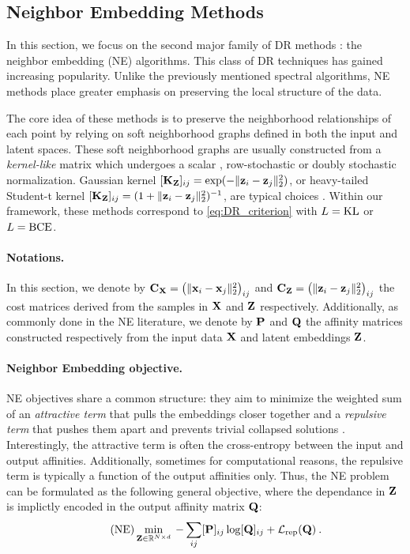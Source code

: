 \subsection{Neighbor Embedding Methods}

In this section, we focus on the second major family of DR methods : the neighbor embedding (NE) algorithms. This class of DR techniques has gained increasing popularity. Unlike the previously mentioned spectral algorithms, NE methods place greater emphasis on preserving the local structure of the data.

The core idea of these methods is to preserve the neighborhood relationships of each point by relying on soft neighborhood graphs defined in both the input and latent spaces. These soft neighborhood graphs are usually constructed from a \emph{kernel-like} matrix which undergoes a scalar \citep{van2008visualizing}, row-stochastic \citep{hinton2002stochastic} or doubly stochastic \citep{lu2019doubly,van2023snekhorn} normalization. Gaussian kernel $[{\mathbf{K}}_{\mathbf{Z}}]_{ij} = \exp(-\|{\mathbf{z}}_i-{\mathbf{z}}_j\|_2^2)$, or heavy-tailed Student-t kernel $[{\mathbf{K}}_{\mathbf{Z}}]_{ij} = (1+\|{\mathbf{z}}_i-{\mathbf{z}}_j\|_2^2)^{-1}$, are typical choices \citep{van2008visualizing}.
Within our framework, these methods correspond to \cref{eq:DR_criterion} with $L = \operatorname{KL}$ or $L=\operatorname{BCE}$.

\paragraph{Notations.}
In this section, we denote by $\mathbf{C}_{\mathbf{X}} = \left(\|{\mathbf{x}}_{i}-{\mathbf{x}}_{j}\|_2^2\right)_{ij}$ and $\mathbf{C}_{\mathbf{Z}} = \left(\|{\mathbf{z}}_{i}-{\mathbf{z}}_{j}\|_2^2\right)_{ij}$ the cost matrices derived from the samples in $\mathbf{X}$ and $\mathbf{Z}$ respectively. Additionally, as commonly done in the NE literature, we denote by ${\mathbf{P}}$ and ${\mathbf{Q}}$ the affinity matrices constructed respectively from the input data ${\mathbf{X}}$ and latent embeddings ${\mathbf{Z}}$.

\paragraph{Neighbor Embedding objective.}
NE objectives share a common structure: they aim to minimize the weighted sum of an \emph{attractive term} that pulls the embeddings closer together and a \emph{repulsive term} that pushes them apart and prevents trivial collapsed solutions \citep{van2022probabilistic}. Interestingly, the attractive term is often the cross-entropy between the input and output affinities. Additionally, sometimes for computational reasons, the repulsive term is typically a function of the output affinities only. Thus, the NE problem can be formulated as the following general objective, where the dependance in ${\mathbf{Z}}$ is implictly encoded in the output affinity matrix ${\mathbf{Q}}$:
\begin{align}\tag{NE}\label{eq:ne_attraction_repulsion}
    \min_{{\mathbf{Z}} \in \mathbb{R}^{N \times d}} \: - \sum_{ij} [{\mathbf{P}}]_{ij} \log [{\mathbf{Q}}]_{ij} + \mathcal{L}_{\mathrm{rep}}({\mathbf{Q}}) \:.
\end{align}

